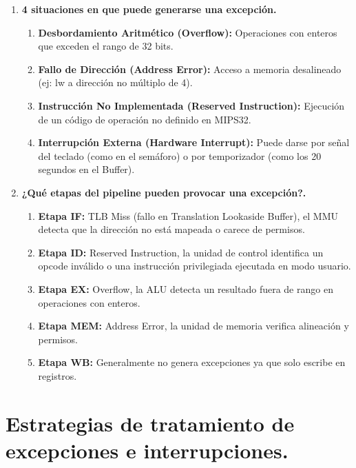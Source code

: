 \documentclass{article}
\begin{document}
\begin{enumerate}
    \item \textbf{4 situaciones en que puede generarse una excepción.}
    
    \begin{enumerate}
        \item \textbf{Desbordamiento Aritmético (Overflow): }Operaciones con enteros que exceden el rango de 32 bits.

        \item \textbf{Fallo de Dirección (Address Error): }Acceso a memoria desalineado (ej: lw a dirección no múltiplo de 4).

        \item \textbf{Instrucción No Implementada (Reserved Instruction): }Ejecución de un código de operación no definido en MIPS32.

        \item \textbf{Interrupción Externa (Hardware Interrupt): }Puede darse por señal del teclado (como en el semáforo) o por temporizador (como los 20 segundos en el Buffer).
    \end{enumerate}
    
    \item \textbf{¿Qué etapas del pipeline pueden provocar una excepción?.}

    \begin{enumerate}
        \item \textbf{Etapa IF: }TLB Miss (fallo en Translation Lookaside Buffer), el MMU detecta que la dirección no está mapeada o carece de permisos.
        \item \textbf{Etapa ID: }Reserved Instruction, la unidad de control identifica un opcode inválido o una instrucción privilegiada ejecutada en modo usuario.
        \item \textbf{Etapa EX: }Overflow, la ALU detecta un resultado fuera de rango en operaciones con enteros.
        \item \textbf{Etapa MEM: }Address Error, la unidad de memoria verifica alineación y permisos.
        \item \textbf{Etapa WB: }Generalmente no genera excepciones ya que solo escribe en registros.
    \end{enumerate}
\end{enumerate}

\section*{Estrategias de tratamiento de excepciones e interrupciones.}
\end{document}
